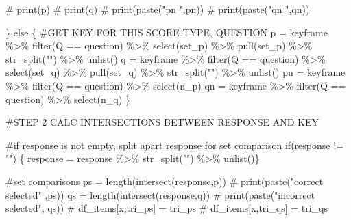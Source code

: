 \documentclass[
  letterpaper,
  DIV=11,
  numbers=noendperiod]{scrreprt}
\newenvironment{Shaded}{\begin{snugshade}}{\end{snugshade}}
\newcommand{\CommentTok}[1]{\textcolor[rgb]{0.37,0.37,0.37}{#1}}
\newcommand{\ControlFlowTok}[1]{\textcolor[rgb]{0.00,0.23,0.31}{#1}}
\newcommand{\FunctionTok}[1]{\textcolor[rgb]{0.28,0.35,0.67}{#1}}
\newcommand{\NormalTok}[1]{\textcolor[rgb]{0.00,0.23,0.31}{#1}}
\newcommand{\OtherTok}[1]{\textcolor[rgb]{0.00,0.23,0.31}{#1}}
\newcommand{\SpecialCharTok}[1]{\textcolor[rgb]{0.37,0.37,0.37}{#1}}
\newcommand{\StringTok}[1]{\textcolor[rgb]{0.13,0.47,0.30}{#1}}
\begin{document}
\begin{Shaded}
\begin{Highlighting}[]
    \CommentTok{\# print(p)}
    \CommentTok{\# print(q)}
    \CommentTok{\# print(paste("pn ",pn))}
    \CommentTok{\# print(paste("qn ",qn))}
    
\NormalTok{  \} }\ControlFlowTok{else}\NormalTok{ \{}
    \CommentTok{\#GET KEY FOR THIS SCORE TYPE, QUESTION}
\NormalTok{    p }\OtherTok{=}\NormalTok{  keyframe }\SpecialCharTok{\%\textgreater{}\%} \FunctionTok{filter}\NormalTok{(Q }\SpecialCharTok{==}\NormalTok{ question) }\SpecialCharTok{\%\textgreater{}\%} \FunctionTok{select}\NormalTok{(set\_p) }\SpecialCharTok{\%\textgreater{}\%} \FunctionTok{pull}\NormalTok{(set\_p) }\SpecialCharTok{\%\textgreater{}\%} \FunctionTok{str\_split}\NormalTok{(}\StringTok{""}\NormalTok{) }\SpecialCharTok{\%\textgreater{}\%} \FunctionTok{unlist}\NormalTok{()}
\NormalTok{    q }\OtherTok{=}\NormalTok{  keyframe }\SpecialCharTok{\%\textgreater{}\%} \FunctionTok{filter}\NormalTok{(Q }\SpecialCharTok{==}\NormalTok{ question) }\SpecialCharTok{\%\textgreater{}\%} \FunctionTok{select}\NormalTok{(set\_q) }\SpecialCharTok{\%\textgreater{}\%} \FunctionTok{pull}\NormalTok{(set\_q) }\SpecialCharTok{\%\textgreater{}\%} \FunctionTok{str\_split}\NormalTok{(}\StringTok{""}\NormalTok{) }\SpecialCharTok{\%\textgreater{}\%} \FunctionTok{unlist}\NormalTok{()}
\NormalTok{    pn }\OtherTok{=}\NormalTok{ keyframe }\SpecialCharTok{\%\textgreater{}\%} \FunctionTok{filter}\NormalTok{(Q }\SpecialCharTok{==}\NormalTok{ question) }\SpecialCharTok{\%\textgreater{}\%} \FunctionTok{select}\NormalTok{(n\_p)}
\NormalTok{    qn }\OtherTok{=}\NormalTok{ keyframe }\SpecialCharTok{\%\textgreater{}\%} \FunctionTok{filter}\NormalTok{(Q }\SpecialCharTok{==}\NormalTok{ question) }\SpecialCharTok{\%\textgreater{}\%} \FunctionTok{select}\NormalTok{(n\_q)}
\NormalTok{  \}}

  \CommentTok{\#STEP 2 CALC INTERSECTIONS BETWEEN RESPONSE AND KEY}
  
  \CommentTok{\#if response is not empty, split apart response for set comparison}
    \ControlFlowTok{if}\NormalTok{(response }\SpecialCharTok{!=} \StringTok{""}\NormalTok{)}
\NormalTok{    \{ response }\OtherTok{=}\NormalTok{ response }\SpecialCharTok{\%\textgreater{}\%} \FunctionTok{str\_split}\NormalTok{(}\StringTok{""}\NormalTok{) }\SpecialCharTok{\%\textgreater{}\%} \FunctionTok{unlist}\NormalTok{()\}}
  
  \CommentTok{\#set comparisons }
\NormalTok{  ps }\OtherTok{=} \FunctionTok{length}\NormalTok{(}\FunctionTok{intersect}\NormalTok{(response,p))}
  \CommentTok{\# print(paste("correct selected" ,ps))}
\NormalTok{  qs }\OtherTok{=} \FunctionTok{length}\NormalTok{(}\FunctionTok{intersect}\NormalTok{(response,q))}
  \CommentTok{\# print(paste("incorrect selected", qs))}
  \CommentTok{\# df\_items[x,\textquotesingle{}tri\_ps\textquotesingle{}] = tri\_ps}
  \CommentTok{\# df\_items[x,\textquotesingle{}tri\_qs\textquotesingle{}] = tri\_qs}


\end{Highlighting}
\end{Shaded}
\end{document}
